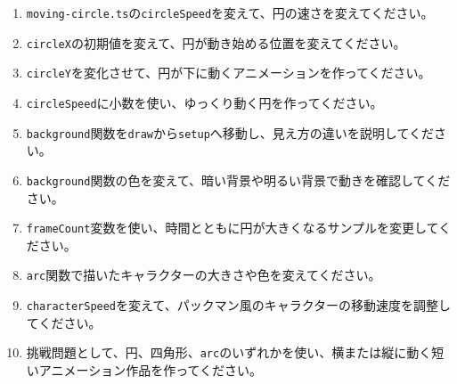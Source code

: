 \begin{enumerate}
    \item \texttt{moving-circle.ts}の\texttt{circleSpeed}を変えて、円の速さを変えてください。
    \item \texttt{circleX}の初期値を変えて、円が動き始める位置を変えてください。
    \item \texttt{circleY}を変化させて、円が下に動くアニメーションを作ってください。
    \item \texttt{circleSpeed}に小数を使い、ゆっくり動く円を作ってください。
    \item \texttt{background}関数を\texttt{draw}から\texttt{setup}へ移動し、見え方の違いを説明してください。
    \item \texttt{background}関数の色を変えて、暗い背景や明るい背景で動きを確認してください。
    \item \texttt{frameCount}変数を使い、時間とともに円が大きくなるサンプルを変更してください。
    \item \texttt{arc}関数で描いたキャラクターの大きさや色を変えてください。
    \item \texttt{characterSpeed}を変えて、パックマン風のキャラクターの移動速度を調整してください。
    \item 挑戦問題として、円、四角形、\texttt{arc}のいずれかを使い、横または縦に動く短いアニメーション作品を作ってください。
\end{enumerate}
